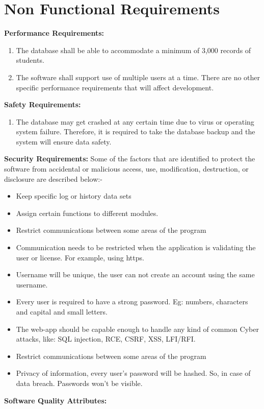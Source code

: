 \section{Non Functional Requirements}

\textbf{Performance Requirements:}
\begin{enumerate}
\item The database shall be able to accommodate a minimum of 3,000 records of students.
\item The software shall support use of multiple users at a time. There are no other specific performance requirements that will affect development.
\end{enumerate}
\textbf{Safety Requirements:}
\begin{enumerate}
\item The database may get crashed at any certain time due to virus or operating system failure. Therefore, it is required to take the database backup and the system will ensure data safety.
\end{enumerate}
\textbf{ Security Requirements:}\newline\newline
Some of the factors that are identified to protect the software from accidental or malicious access, use, modification, destruction, or disclosure are described below:-      
\begin{itemize}
\item Keep specific log or history data sets
\item Assign certain functions to different modules.
\item Restrict communications between some areas of the program
\item Communication needs to be restricted when the application is validating the user or license. For example, using https.
\item Username will be unique, the user can not create an account using the same username.
\item Every user is required to have a strong password. Eg: numbers, characters and capital and small letters. 
\item The web-app should be capable enough to handle any kind of common Cyber attacks, like: SQL injection, RCE, CSRF, XSS, LFI/RFI.
\item Restrict communications between some areas of the program
\item Privacy of information, every user's password will be hashed. So, in case of data breach. Passwords won’t be visible. 

\end{itemize}
\textbf{Software Quality Attributes:}

